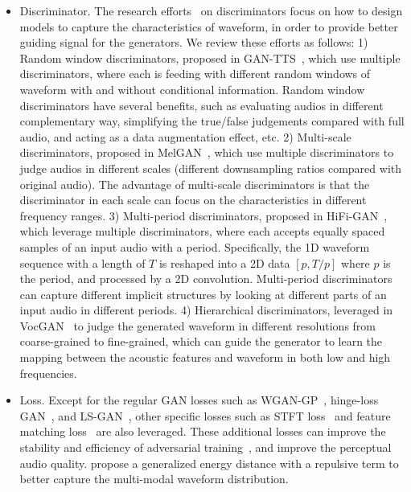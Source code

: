 \documentclass{article}
\begin{document}
\begin{itemize}[leftmargin=*]
\item Discriminator. The research efforts~\cite{binkowski2019high,kumar2019melgan,kong2020hifi,yang2020vocgan} on discriminators focus on how to design models to capture the characteristics of waveform, in order to provide better guiding signal for the generators. We review these efforts as follows: 1) Random window discriminators, proposed in GAN-TTS~\cite{binkowski2019high}, which use multiple discriminators, where each is feeding with different random windows of waveform with and without conditional information. Random window discriminators have several benefits, such as evaluating audios in different complementary way, simplifying the true/false judgements compared with full audio, and acting as a data augmentation effect, etc. 2) Multi-scale discriminators, proposed in MelGAN~\cite{kumar2019melgan}, which use multiple discriminators to judge audios in different scales (different downsampling ratios compared with original audio). The advantage of multi-scale discriminators is that the discriminator in each scale can focus on the characteristics in different frequency ranges. 3) Multi-period discriminators, proposed in HiFi-GAN~\cite{kong2020hifi}, which leverage multiple discriminators, where each accepts equally spaced samples of an input audio with a period. Specifically, the 1D waveform sequence with a length of $T$ is reshaped into a 2D data $[p, T/p]$ where $p$ is the period, and processed by a 2D convolution. Multi-period discriminators can capture different implicit structures by looking at different parts of an input audio in different periods. 4) Hierarchical discriminators, leveraged in VocGAN~\cite{yang2020vocgan} to judge the generated waveform in different resolutions from coarse-grained to fine-grained, which can guide the generator to learn the mapping between the acoustic features and waveform in both low and high frequencies.

\item Loss. Except for the regular GAN losses such as WGAN-GP~\cite{gulrajani2017improved}, hinge-loss GAN~\cite{lim2017geometric}, and LS-GAN~\cite{mao2017least}, other specific losses such as STFT loss~\cite{arik2018fast,yamamoto2019probability} and feature matching loss~\cite{larsen2016autoencoding} are also leveraged. These additional losses can improve the stability and efficiency of adversarial training~\cite{yamamoto2020parallel}, and improve the perceptual audio quality. \citet{gritsenko2020spectral} propose a generalized energy distance with a repulsive term to better capture the multi-modal waveform distribution.
\end{itemize}
\end{document}

